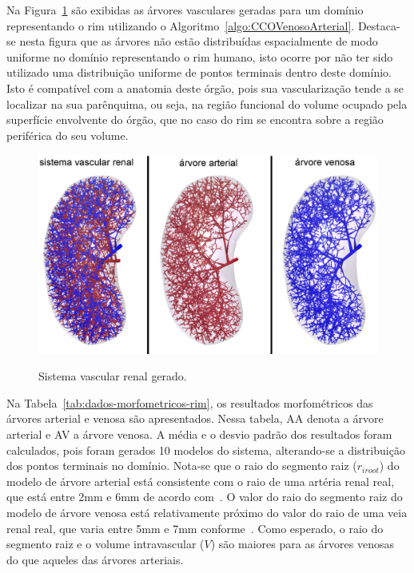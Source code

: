 Na Figura~\ref{fig:resRim3DAcopla} são exibidas as árvores vasculares geradas para 
um domínio representando o rim utilizando o  
Algoritmo~\ref{algo:CCOVenosoArterial}. Destaca-se nesta figura que as árvores 
não estão distribuídas espacialmente de modo uniforme no domínio representando 
o rim humano, isto ocorre por não ter sido utilizado uma distribuição uniforme de 
pontos terminais dentro deste domínio. Isto é compatível com a anatomia deste 
órgão, pois sua vascularização tende a se localizar na sua parênquima, 
ou seja, na região funcional do volume ocupado pela superfície 
envolvente do órgão, que no caso do rim se encontra sobre a região periférica do seu volume.

\begin{figure}[!htb]
  \centering
  \captiondelim{: }
  \caption{Sistema vascular renal gerado.}
  \includegraphics[width=\textwidth]{figuras/modelos-computacionais-de-arvores-circulatorias/DomFix_RimAcoplamentoNaoUniforme.eps}
  \label{fig:resRim3DAcopla}
\end{figure}

Na Tabela~\ref{tab:dados-morfometricos-rim}, os resultados morfométricos das árvores arterial e venosa são apresentados. 
Nessa tabela, AA denota a árvore arterial e AV a árvore venosa. A média e o desvio padrão dos resultados 
foram calculados, pois foram gerados 10 modelos do sistema, alterando-se a distribuição dos pontos terminais no 
domínio. Nota-se que o raio do segmento raiz ($r_{iroot}$) do modelo de árvore arterial está consistente com o 
raio de uma artéria renal real, que está entre 2mm e 6mm de acordo com~\cite{Weld2005}. O valor do raio do 
segmento raiz do modelo de árvore venosa está relativamente próximo do valor do raio de uma veia 
renal real, que varia entre 5mm e 7mm conforme~\cite{Satyapal2019}. Como esperado, o raio do segmento raiz 
e o volume intravascular ($V$) são maiores para as árvores venosas do que aqueles das árvores arteriais.

